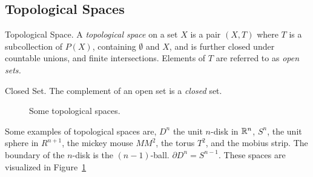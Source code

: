 \subsection{Topological Spaces}
\begin{definition}{Topological Space.}
A \emph{topological space} on a set $X$ is a pair $(X,T)$ where $T$ is a subcollection of $P(X)$, containing $\emptyset$ and $X$, and is further closed under countable unions, and finite intersections. Elements of $T$ are referred to as \emph{open sets.}
\end{definition}
\begin{definition}{Closed Set.}
 The complement of an open set is a \emph{closed} set.
\end{definition}
\begin{figure}
\centering
{}
\caption{Some topological spaces.}
\label{fig:example-ts}
\end{figure}
Some examples of topological spaces are, $D^n$ the unit $n$-disk in $\mathbb{R}^n$, $S^n$, the unit sphere in $R^{n+1}$, the mickey mouse $MM^2$, the torus $T^2$, and the mobius strip. The boundary of the $n$-disk is the $(n-1)$-ball. $\partial D^n = S^{n-1}$. These spaces are visualized in Figure~\ref{fig:example-ts}

